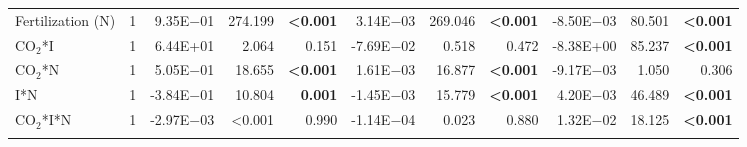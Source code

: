 \begin{landscape}
\begin{table}
{\begin{tabular}{p{3cm}p{0.5cm}p{1.75cm}p{1.5cm}p{1.5cm}p{1.75cm}p{1.5cm}p{1.5cm}p{1.75cm}p{1.5cm}p{1.5cm}}
            Fertilization (N) & \multicolumn{1}{r}{1}
            & \multicolumn{1}{r}{9.35E$-$01}      & \multicolumn{1}{r}{274.199}       & \multicolumn{1}{r}{\textbf{<0.001}}
            & \multicolumn{1}{r}{3.14E$-$03}      & \multicolumn{1}{r}{269.046}       & \multicolumn{1}{r}{\textbf{<0.001}}
            & \multicolumn{1}{r}{-8.50E$-$03}     & \multicolumn{1}{r}{80.501}        & \multicolumn{1}{r}{\textbf{<0.001}} 
            \\

            CO$_2$*I & \multicolumn{1}{r}{1}
            & \multicolumn{1}{r}{6.44E+01}      & \multicolumn{1}{r}{2.064}         & \multicolumn{1}{r}{0.151}
            & \multicolumn{1}{r}{-7.69E$-$02}   & \multicolumn{1}{r}{0.518}         & \multicolumn{1}{r}{0.472}
            & \multicolumn{1}{r}{-8.38E+00}     & \multicolumn{1}{r}{85.237}        & \multicolumn{1}{r}{\textbf{<0.001}} 
            \\

            CO$_2$*N & \multicolumn{1}{r}{1}
            & \multicolumn{1}{r}{5.05E$-$01}      & \multicolumn{1}{r}{18.655}        & \multicolumn{1}{r}{\textbf{<0.001}}
            & \multicolumn{1}{r}{1.61E$-$03}      & \multicolumn{1}{r}{16.877}        & \multicolumn{1}{r}{\textbf{<0.001}}
            & \multicolumn{1}{r}{-9.17E$-$03}     & \multicolumn{1}{r}{1.050}         & \multicolumn{1}{r}{0.306} 
            \\

            I*N & \multicolumn{1}{r}{1}
            & \multicolumn{1}{r}{-3.84E$-$01}     & \multicolumn{1}{r}{10.804}        & \multicolumn{1}{r}{\textbf{0.001}}
            & \multicolumn{1}{r}{-1.45E$-$03}     & \multicolumn{1}{r}{15.779}        & \multicolumn{1}{r}{\textbf{<0.001}}
            & \multicolumn{1}{r}{4.20E$-$03}      & \multicolumn{1}{r}{46.489}        & \multicolumn{1}{r}{\textbf{<0.001}} 
            \\

            CO$_2$*I*N & \multicolumn{1}{r}{1}
            & \multicolumn{1}{r}{-2.97E$-$03}     & \multicolumn{1}{r}{<0.001}        & \multicolumn{1}{r}{0.990}
            & \multicolumn{1}{r}{-1.14E$-$04}     & \multicolumn{1}{r}{0.023}         & \multicolumn{1}{r}{0.880}
            & \multicolumn{1}{r}{1.32E$-$02}      & \multicolumn{1}{r}{18.125}        & \multicolumn{1}{r}{\textbf{<0.001}} 
            \\
            \hline

            &&&&&&&&&&
            \\


\end{tabular}}
\end{table}
\end{landscape}
